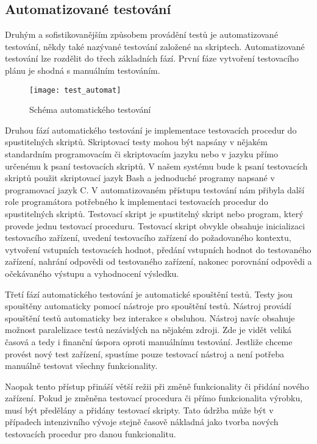\subsection{Automatizované testování}
Druhým a sofistikovanějším způsobem provádění testů je automatizované testování, někdy také nazývané testování založené na skriptech. Automatizované testování lze rozdělit do třech základních fází. První fáze vytvoření testovacího plánu je shodná s manuálním testováním.

\begin{figure}[h]
  \centering
  \texttt{[image: test\_automat]}
  \caption{Schéma automatického testování}
  \label{fig:test_automat}
\end{figure}

Druhou fází automatického testování je implementace testovacích procedur do spustitelných skriptů. Skriptovací testy mohou být napsány v nějakém standardním programovacím či skriptovacím jazyku nebo v jazyku přímo určenému k psaní testovacích skriptů. V našem systému bude k psaní testovacích skriptů použit skriptovací jazyk Bash a jednoduché programy napsané v programovací jazyk C. V automatizovaném přístupu testování nám přibyla další role programátora potřebného k implementaci testovacích procedur do spustitelných skriptů. Testovací skript je spustitelný skript nebo program, který provede jednu testovací proceduru. Testovací skript obvykle obsahuje inicializaci testovacího zařízení, uvedení testovacího zařízení do požadovaného kontextu, vytvoření vstupních testovacích hodnot, předání vstupních hodnot do testovaného zařízení, nahrání odpovědi od testovaného zařízení, nakonec porovnání odpovědi a očekávaného výstupu a vyhodnocení výsledku.

Třetí fází automatického testování je automatické spouštění testů. Testy jsou spouštěny automaticky pomocí nástroje pro spouštění testů. Nástroj provádí spouštění testů automaticky bez interakce s obsluhou. Nástroj navíc obsahuje možnost paralelizace testů nezávislých na nějakém zdroji. Zde je vidět veliká časová a tedy i finanční úspora oproti manuálnímu testování. Jestliže chceme provést nový test zařízení, spustíme pouze testovací nástroj a není potřeba manuálně testovat všechny funkcionality.

Naopak tento přístup přináší větší režii při změně funkcionality či přidání nového zařízení. Pokud je změněna testovací procedura či přímo funkcionalita výrobku, musí být předělány a přidány testovací skripty. Tato údržba může být v případech intenzivního vývoje stejně časově nákladná jako tvorba nových testovacích procedur pro danou funkcionalitu.

